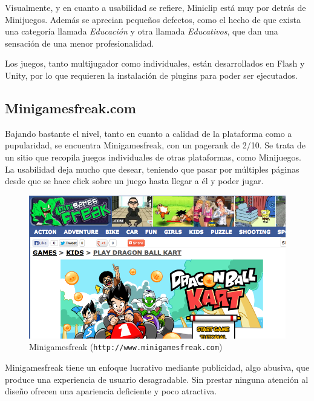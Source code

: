 Visualmente, y en cuanto a usabilidad se refiere, Miniclip está muy por detrás de Minijuegos. Además se aprecian pequeños defectos, como el hecho de que exista una categoría llamada {\it Educación} y otra llamada {\it Educativos}, que dan una sensación de una menor profesionalidad.

Los juegos, tanto multijugador como individuales, están desarrollados en Flash y Unity, por lo que requieren la instalación de plugins para poder ser ejecutados.

\subsection*{Minigamesfreak.com}

Bajando bastante el nivel, tanto en cuanto a calidad de la plataforma como a pupularidad, se encuentra Minigamesfreak, con un pagerank de 2/10. Se trata de un sitio que recopila juegos individuales de otras plataformas, como Minijuegos. La usabilidad deja mucho que desear, teniendo que pasar por múltiples páginas desde que se hace click sobre un juego hasta llegar a él y poder jugar.

\begin{figure}[h]
  \begin{center}
    \includegraphics[width=\textwidth]{images/minigamesfreak.png}
    \caption{Minigamesfreak ({\tt http://www.minigamesfreak.com})}
    \label{fig::minigamesfreak}
  \end{center}
\end{figure}

Minigamesfreak tiene un enfoque lucrativo mediante publicidad, algo abusiva, que produce una experiencia de usuario desagradable. Sin prestar ninguna atención al diseño ofrecen una apariencia deficiente y poco atractiva.

